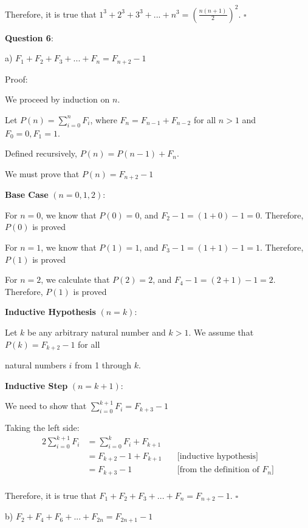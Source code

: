 \documentclass{article} %
\newcommand{\question}[2][]{\begin{flushleft}
        \textbf{Question #1}: \text{#2}

\end{flushleft}}
\begin{document}
    Therefore, it is true that $1^3 + 2^3 + 3^3 + ... + n^3 = (\frac{n(n+1)}{2})^2$. $\square$

    \newpage

    \question[6]{}

    a) $F_1 + F_2 + F_3 + ... + F_n = F_{n + 2} - 1$

    Proof: 
    
    We proceed by induction on $n$.

    Let $P(n) = \sum_{i = 0}^{n} F_i$, where $F_n = F_{n - 1} + F_{n - 2}$ for all $n > 1$ and $F_0 = 0, F_1 = 1$.

    Defined recursively, $P(n) = P(n - 1) + F_n$.

    We must prove that $P(n) = F_{n + 2} - 1$

    \textbf{Base Case} $(n = 0, 1, 2)$:

    For $n = 0$, we know that $P(0) = 0$, and $F_2 - 1 = (1 + 0) - 1 = 0$. Therefore, $P(0)$ is proved

    For $n = 1$, we know that $P(1) = 1$, and $F_3 - 1 = (1 + 1) - 1 = 1$. Therefore, $P(1)$ is proved

    For $n = 2$, we calculate that $P(2) = 2$, and $F_4 - 1 = (2 + 1) - 1 = 2$. Therefore, $P(1)$ is proved

    \textbf{Inductive Hypothesis} $(n = k)$:

    Let $k$ be any arbitrary natural number and $k > 1$. We assume that $P(k) = F_{k+2} - 1$ for all
    
    natural numbers $i$ from 1 through $k$.

    \textbf{Inductive Step} $(n = k+1)$:

    We need to show that $\sum_{i = 0}^{k+1} F_i = F_{k + 3} - 1$

    Taking the left side:
    \begin{alignat*}{2}
        \sum_{i = 0}^{k+1} F_i &= \sum_{i = 0}^{k} F_i + F_{k + 1}\\
        &= F_{k + 2} - 1 + F_{k + 1}\ &&\text{[inductive hypothesis]}\\
        &= F_{k + 3} - 1 &&\text{[from the definition of $F_n$]}\\
    \end{alignat*}
    
    Therefore, it is true that $F_1 + F_2 + F_3 + ... + F_n = F_{n + 2} - 1$. $\square$

    \newpage

    b) $F_2 + F_4 + F_6 + ... + F_{2n} = F_{2n + 1} - 1$
\end{document}
